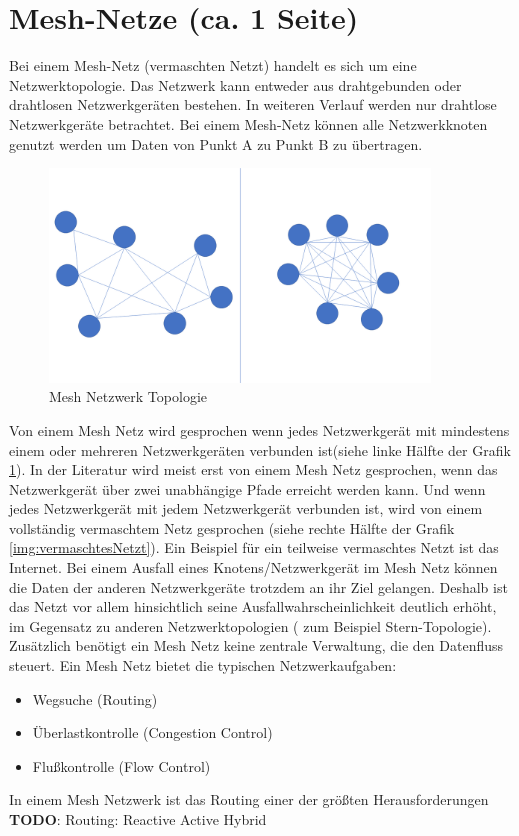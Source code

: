 \section{Mesh-Netze (ca. 1 Seite)}

Bei einem Mesh-Netz (vermaschten Netzt) handelt es sich um eine Netzwerktopologie. Das Netzwerk kann entweder aus drahtgebunden oder drahtlosen Netzwerkgeräten bestehen. In weiteren Verlauf werden nur drahtlose Netzwerkgeräte betrachtet. Bei einem Mesh-Netz können alle Netzwerkknoten genutzt werden um Daten von Punkt A zu Punkt B zu übertragen. 
\begin{figure}
	\centering
	\includegraphics[width=0.9\textwidth]{bilder/vermaschtesNetz.png}
	\caption{ Mesh Netzwerk Topologie }
	\label{img:vermaschtesNetz}
\end{figure}


Von einem Mesh Netz wird gesprochen wenn jedes Netzwerkgerät mit mindestens einem oder mehreren Netzwerkgeräten verbunden ist(siehe linke Hälfte der Grafik \ref{img:vermaschtesNetz}). In der Literatur wird meist erst von einem Mesh Netz gesprochen, wenn das Netzwerkgerät über zwei unabhängige Pfade erreicht werden kann. Und wenn jedes Netzwerkgerät mit jedem Netzwerkgerät verbunden ist, wird von einem vollständig vermaschtem Netz gesprochen (siehe rechte Hälfte der Grafik \ref{img:vermaschtesNetzt}). Ein Beispiel für ein teilweise vermaschtes Netzt ist das Internet. 
Bei einem Ausfall eines Knotens/Netzwerkgerät im Mesh Netz können die Daten der anderen Netzwerkgeräte trotzdem an ihr Ziel gelangen. Deshalb ist das Netzt vor allem hinsichtlich seine Ausfallwahrscheinlichkeit deutlich erhöht, im Gegensatz zu anderen Netzwerktopologien ( zum Beispiel Stern-Topologie).  Zusätzlich benötigt ein Mesh Netz keine zentrale Verwaltung, die den Datenfluss steuert.
Ein Mesh Netz bietet die typischen Netzwerkaufgaben:
\begin{itemize}
	\item Wegsuche (Routing)
	\item Überlastkontrolle (Congestion Control)
	\item Flußkontrolle (Flow Control)
\end{itemize}

In einem Mesh Netzwerk ist das Routing einer der größten Herausforderungen \textbf{TODO}: Routing: Reactive Active Hybrid
